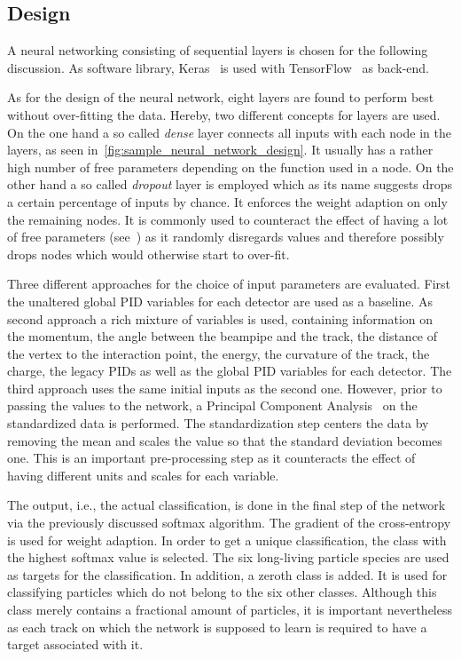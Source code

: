 \subsection{Design}
\label{sec:neural_network_design}

A neural networking consisting of sequential layers is chosen for the following discussion. As software library, Keras~\cite{chollet2015keras} is used with TensorFlow~\cite{tensorflow2015-whitepaper} as back-end.

As for the design of the neural network, eight layers are found to perform best without over-fitting the data. Hereby, two different concepts for layers are used. On the one hand a so called \textit{dense} layer connects all inputs with each node in the layers, as seen in~\autoref{fig:sample_neural_network_design}. It usually has a rather high number of free parameters depending on the function used in a node. On the other hand a so called \textit{dropout} layer is employed which as its name suggests drops a certain percentage of inputs by chance. It enforces the weight adaption on only the remaining nodes. It is commonly used to counteract the effect of having a lot of free parameters (see~\cite{MachineLearning:DeepLearning}) as it randomly disregards values and therefore possibly drops nodes which would otherwise start to over-fit.

Three different approaches for the choice of input parameters are evaluated. First the unaltered global PID variables for each detector are used as a baseline. As second approach a rich mixture of variables is used, containing information on the momentum, the angle between the beampipe and the track, the distance of the vertex to the interaction point, the energy, the curvature of the track, the charge, the legacy PIDs as well as the global PID variables for each detector. The third approach uses the same initial inputs as the second one. However, prior to passing the values to the network, a Principal Component Analysis~\cite{BigDataManagementAndAnalytics:TextProcessingAndHigh-DimensionalData} on the standardized data is performed. The standardization step centers the data by removing the mean and scales the value so that the standard deviation becomes one. This is an important pre-processing step as it counteracts the effect of having different units and scales for each variable.

The output, i.e., the actual classification, is done in the final step of the network via the previously discussed softmax algorithm. The gradient of the cross-entropy is used for weight adaption. In order to get a unique classification, the class with the highest softmax value is selected. The six long-living particle species are used as targets for the classification. In addition, a zeroth class is added. It is used for classifying particles which do not belong to the six other classes. Although this class merely contains a fractional amount of particles, it is important nevertheless as each track on which the network is supposed to learn is required to have a target associated with it.

